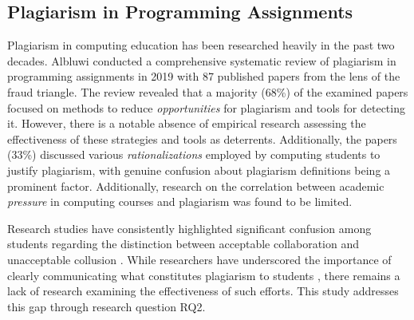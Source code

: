 \subsection{Plagiarism in Programming Assignments}
Plagiarism in computing education has been researched heavily in the past two decades. Albluwi \cite{10.1145/3371156} conducted a comprehensive systematic review of plagiarism in programming assignments in 2019 with 87 published papers from the lens of the fraud triangle. The review revealed that a majority (68\%) of the examined papers focused on methods to reduce \textit{opportunities} for plagiarism and tools for detecting it. However, there is a notable absence of empirical research assessing the effectiveness of these strategies and tools as deterrents. Additionally, the papers (33\%) discussed various \textit{rationalizations} employed by computing students to justify plagiarism, with genuine confusion about plagiarism definitions being a prominent factor. Additionally, research on the correlation between academic \textit{pressure} in computing courses and plagiarism was found to be limited.

Research studies have consistently highlighted significant confusion among students regarding the distinction between acceptable collaboration and unacceptable collusion \cite{10.1145/2591708.2591755, 10.1145/2632320.2632342, Joy2011SourceCP}. While researchers have underscored the importance of clearly communicating what constitutes plagiarism to students \cite{10.1145/1595496.1562900, 10.1145/3160489.3160502, 10.1145/1734263.1734365, 10.1145/3024906.3024910}, there remains a lack of research examining the effectiveness of such efforts. This study addresses this gap through research question RQ2.



